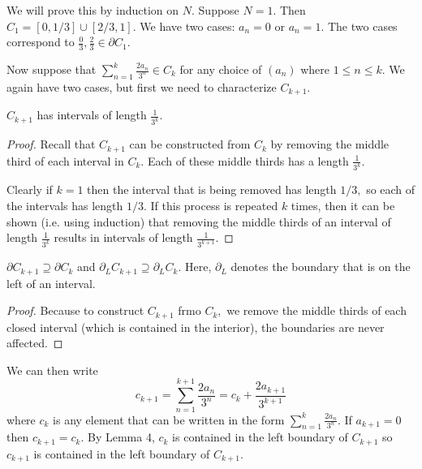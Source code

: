 \documentclass{article}
\numberwithin{equation}{section}
\begin{document}
\begin{enumerate}
\begin{enumerate}[label=Proof of (\arabic*)]
        We will prove this by induction on $N.$ Suppose $N=1.$ Then $C_1 = [0,1/3] \cup [2/3,1].$ We have two cases: $a_n=0$ or $a_n=1.$ The two cases correspond to $\frac{0}{3},\frac{2}{3} \in \partial C_1.$

        Now suppose that $\sum_{n=1}^{k} \frac{2a_n}{3^n} \in C_k$ for any choice of $(a_n)$ where $1\le n \le k.$ We again have two cases, but first we need to characterize $C_{k+1}.$
        \begin{lemma}
            $C_{k+1}$ has intervals of length $\frac{1}{3^k}.$
        
            \begin{proof}
                Recall that $C_{k+1}$ can be constructed from $C_{k}$ by removing the middle third of each interval in $C_k.$ Each of these middle thirds has a length $\frac{1}{3^k}.$
                \vspace{2mm}

                Clearly if $k=1$ then the interval that is being removed has length $1/3,$ so each of the intervals has length $1/3.$ If this process is repeated $k$ times, then it can be shown (i.e. using induction) that removing the middle thirds of an interval of length $\frac{1}{3^k}$ results in intervals of length $\frac{1}{3^{k+1}}.$
            \end{proof}
        \end{lemma}
        \begin{lemma}
            $\partial C_{k+1} \supseteq \partial C_{k}$ and $\partial_L C_{k+1} \supseteq \partial_L C_{k}.$ Here, $\partial_L$ denotes the boundary that is on the left of an interval.
            \begin{proof}
                Because to construct $C_{k+1}$ frmo $C_{k},$ we remove the middle thirds of each closed interval (which is contained in the interior), the boundaries are never affected.
            \end{proof}
        \end{lemma}
        We can then write 
        \begin{equation}
            c_{k+1} = \sum_{n=1}^{k+1} \frac{2a_n}{3^n} = c_k + \frac{2a_{k+1}}{3^{k+1}}
        \end{equation}
        where $c_{k}$ is any element that can be written in the form $\sum_{n=1}^{k} \frac{2a_n}{3^n}.$ If $a_{k+1}=0$ then $c_{k+1} = c_k.$ By Lemma 4, $c_k$ is contained in the left boundary of $C_{k+1}$ so $c_{k+1}$ is contained in the left boundary of $C_{k+1}.$
        

\end{enumerate}
\end{enumerate}
\end{document}
